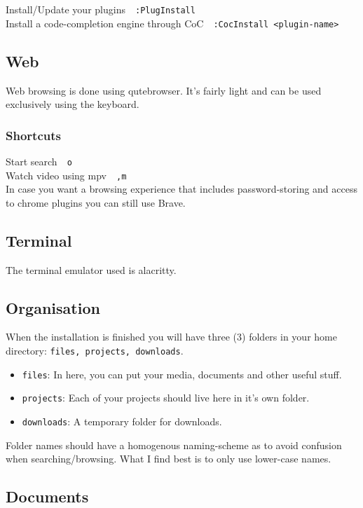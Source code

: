 \documentclass{article}
\newcommand{\ttt}[1]{\texttt{#1}}
\newcommand{\shortcut}[2]{#1~\dotfill{}~\ttt{#2}\\} %
\newcommand{\terminalemulator}{alacritty}
\newcommand{\browser}{qutebrowser}
\newcommand{\altbrowser}{Brave}
\newcommand{\videoplayer}{mpv}
\begin{document}
\shortcut{Install/Update your plugins}{:PlugInstall}
\shortcut{Install a code-completion engine through CoC}{:CocInstall \textless plugin-name\textgreater}

\subsection{Web}

Web browsing is done using \browser. It's fairly light and can be used 
exclusively using the keyboard.

\subsubsection{Shortcuts}

\shortcut{Start search}{o}
\shortcut{Watch video using \videoplayer}{,m}

In case you want a browsing experience that includes password-storing 
and access to chrome plugins you can still use \altbrowser.

\subsection{Terminal}

The terminal emulator used is \terminalemulator.

\subsection{Organisation}

When the installation is finished you will have three (3)
folders in your home directory: \ttt{files, projects, downloads}.

\begin{itemize}
    \item \ttt{files}: In here, you can put your media, documents and other useful stuff.
    \item \ttt{projects}: Each of your projects should live here in it's own folder.
    \item \ttt{downloads}: A temporary folder for downloads.
\end{itemize}

Folder names should have a homogenous naming-scheme as to avoid confusion when 
searching/browsing. What I find best is to only use lower-case names.

\subsection{Documents}
\end{document}
